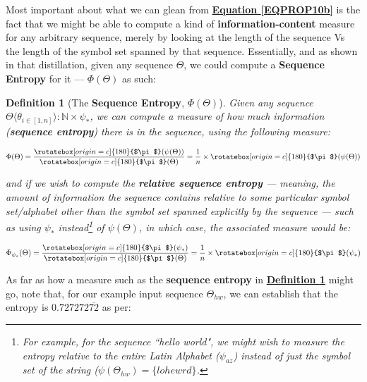 \documentclass[a4paper, 18pt]{book} %
\newtheorem{defn}{Definition}
\newcommand{\invpi}{\rotatebox[origin=c]{180}{$\pi$}}
\begin{document}
\begin{appendices}
Most important about what we can glean from \textbf{\hyperref[EQPROP10b]{Equation \ref{EQPROP10b}}} is the fact that we might be able to compute a kind of \textbf{information-content} measure for any arbitrary sequence, merely by looking at the length of the sequence Vs the length of the symbol set spanned by that sequence. Essentially, and as shown in that distillation, given any sequence $\Theta$, we could compute a \textbf{Sequence Entropy} for it --- $\Phi(\Theta)$ as such:

\vspace{1em}
\begin{defn}[The \textbf{Sequence Entropy}, $\Phi(\Theta)$]
\label{DEFENTROPYb}
Given any sequence $\Theta \langle \theta_{i \in [1,n]} \rangle : \mathbb{N} \times \psi_*$, we can compute a measure of how much information (\textbf{sequence entropy}) there is in the sequence, using the following measure:

\vspace{1em}
\begin{equation}
\Phi(\Theta) = \frac{\invpi(\psi(\Theta))}{\invpi(\Theta)} = \frac{1}{n} \times \invpi(\psi(\Theta))
\end{equation}
\vspace{1em}

and if we wish to compute the \textbf{relative sequence entropy} --- meaning, the amount of information the sequence contains relative to some particular symbol set/alphabet other than the symbol set spanned explicitly by the sequence --- such as using $\psi_*$ instead\footnote{For example, for the sequence ``hello world", we might wish to measure the entropy relative to the entire Latin Alphabet ($\psi_{az}$) instead of just the symbol set of the string ($\psi(\Theta_{hw}) = \{lohe wrd\}$.} of $\psi(\Theta)$, in which case, the associated measure would be: 

\vspace{1em}
\begin{equation}
\Phi_{\psi_*}(\Theta) = \frac{\invpi(\psi_*)}{\invpi(\Theta)} = \frac{1}{n} \times \invpi(\psi_*)
\end{equation}
\end{defn}
\vspace{1em}

As far as how a measure such as the \textbf{sequence entropy} in  \textbf{\hyperref[DEFENTROPYb]{Definition \ref{DEFENTROPYb}}} might go, note that, for our example input sequence $\Theta_{hw}$, we can establish that the entropy is $0.727272\overline{72}$ as per:


\end{appendices}
\end{document}

